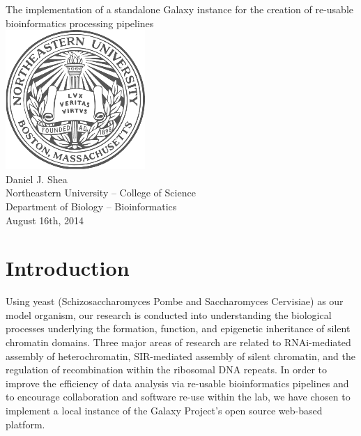 \documentclass[a4paper,10pt]{article}
\begin{document}
\begin{titlepage}
\begin{center}
\huge{The implementation of a standalone Galaxy instance for the creation of re-usable bioinformatics processing pipelines}\vspace{1em}\\
\includegraphics[scale=0.5]{NEU_Logo}\vspace{2em}\\
\LARGE{Daniel J. Shea}\\
\large{Northeastern University -- College of Science}\\
\large{Department of Biology -- Bioinformatics}\\
\large{August 16th, 2014}\\
\end{center}
\end{titlepage}
\tableofcontents
\section{Introduction}
Using yeast (Schizosaccharomyces Pombe and Saccharomyces Cervisiae) as our model organism, our research is conducted into understanding the biological processes underlying the formation, function, and epigenetic inheritance of silent chromatin domains.  Three major areas of research are related to RNAi-mediated assembly of heterochromatin, SIR-mediated assembly of silent chromatin, and the regulation of recombination within the ribosomal DNA repeats.  In order to improve the efficiency of data analysis via re-usable bioinformatics pipelines and to encourage collaboration and software re-use within the lab, we have chosen to implement a local instance of the Galaxy Project's open source web-based platform.\cite{Galaxy01,Galaxy02,Galaxy03}
\end{document}
